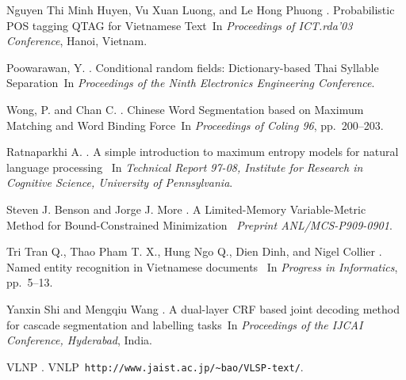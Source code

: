 \documentclass[english]{jnlp_1.4}
\begin{document}
\begin{thebibliography}{}
Nguyen Thi Minh Huyen, Vu Xuan Luong, and Le Hong Phuong \BBCP. \newblock \BBOQ Probabilistic POS
 tagging QTAG for Vietnamese Text\BBCQ\ \newblock In \textit{Proceedings of ICT.rda'03 Conference}, Hanoi, \mbox{Vietnam.}

Poowarawan, Y. \BBCP.
\newblock \BBOQ Conditional random fields: Dictionary-based Thai Syllable Separation\BBCQ\
\newblock In \textit{Proceedings of the Ninth Electronics Engineering
Conference}.

Wong, P. and Chan C. \BBOP 1996\BBCP. \newblock \BBOQ Chinese Word Segmentation based on Maximum Matching and Word Binding Force\BBCQ\
\newblock In \emph{Proceedings of Coling 96}, pp.~200--203.

Ratnaparkhi A.  \BBCP. \newblock \BBOQ A simple introduction to maximum entropy models
for natural language processing\BBCQ\ \newblock
In {\em Technical Report 97-08, Institute for Research in Cognitive Science, University of
Pennsylvania}.

Steven J. Benson and Jorge J. More  \BBCP. \newblock \BBOQ A Limited-Memory
Variable-Metric Method for Bound-Constrained Minimization\BBCQ\ \newblock
\emph{Preprint ANL/MCS-P909-0901}.

Tri Tran Q., Thao Pham T. X., Hung Ngo Q., Dien Dinh, and Nigel Collier \BBCP. \newblock \BBOQ Named entity recognition in Vietnamese documents\BBCQ\ \newblock
In \emph{Progress in Informatics}, pp.~5--13.

Yanxin Shi and Mengqiu Wang \BBCP. \newblock \BBOQ
A dual-layer CRF based joint decoding method for cascade segmentation and labelling tasks\BBCQ\
\newblock In {\em Proceedings of the IJCAI Conference, Hyderabad}, India.

\bibitem[\protect\BCAY{VLNP}{VLNP}{2009}]{VLNP}
VLNP \BBOP 2009\BBCP. \newblock \BBOQ
VNLP\BBCQ\
\newblock \texttt{http://www.jaist.ac.jp/{\textasciitilde}bao/VLSP-text/}.

\end{thebibliography}
\end{document}
